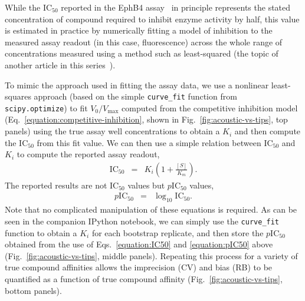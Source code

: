 \documentclass[aps,pre,twocolumn,nofootinbib,superscriptaddress,linenumbers]{revtex4-1}
\begin{document}
While the IC$_{50}$ reported in the EphB4 assay~\cite{ekins_dispensing_2013,barlaam_novel_2009,barlaam_pyrimidine_2010} in principle represents the stated concentration of compound required to inhibit enzyme activity by half, this value is estimated in practice by numerically fitting a model of inhibition to the measured assay readout (in this case, fluorescence) across the whole range of concentrations measured using a method such as least-squared (the topic of another article in this series~\cite{jones_fitting_2015}).

To mimic the approach used in fitting the assay data, we use a nonlinear least-squares approach (based on the simple {\tt curve\_fit} function from {\tt scipy.optimize}) to fit $V_0 / V_\mathrm{max}$ computed from the competitive inhibition model (Eq.~\ref{equation:competitive-inhibition}, shown in Fig.~\ref{fig:acoustic-vs-tips}, top panels) using the true assay well concentrations to obtain a $K_i$ and then compute the IC$_{50}$ from this fit value.
We can then use a simple relation between IC$_{50}$ and $K_{i}$ to compute the reported assay readout,
\begin{eqnarray}
\mathrm{IC}_{50} &=& K_{i}\left(1+\frac{[S]}{K_{m}}\right) \label{equation:IC50} .
\end{eqnarray} 
The reported results are not IC$_{50}$ values but $p$IC$_{50}$ values, 
\begin{eqnarray}
p\mathrm{IC}_{50} &=& \log_{10} \mathrm{IC}_{50} \label{equation:pIC50} .
\end{eqnarray}
Note that no complicated manipulation of these equations is required.
As can be seen in the companion IPython notebook, we can simply use the {\tt curve\_fit} function to obtain a $K_i$ for each bootstrap replicate, and then store the $p$IC$_{50}$ obtained from the use of Eqs.~\ref{equation:IC50} and \ref{equation:pIC50} above (Fig.~\ref{fig:acoustic-vs-tips}, middle panels).
Repeating this process for a variety of true compound affinities allows the imprecision (CV) and bias (RB) to be quantified as a function of true compound affinity (Fig.~\ref{fig:acoustic-vs-tips}, bottom panels).
\end{document}
